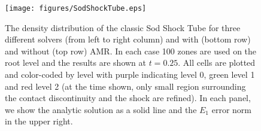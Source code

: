 \begin{figure}
\begin{center}
\texttt{[image: figures/SodShockTube.eps]}
\caption{The density distribution of the classic Sod Shock Tube for
three different solvers (from left to right column) and with (bottom
row) and without (top row) AMR.  In each case 100 zones are used on
the root level and the results are shown at $t=0.25$.  All cells are
plotted and color-coded by level with purple indicating level 0, green
level 1 and red level 2 (at the time shown, only small region
surrounding the contact discontinuity and the shock are refined).  In
each panel, we show the analytic solution as a solid line and the
$E_1$ error norm in the upper right.}
\label{fig.sodshocktube}
\end{center}
\end{figure}


